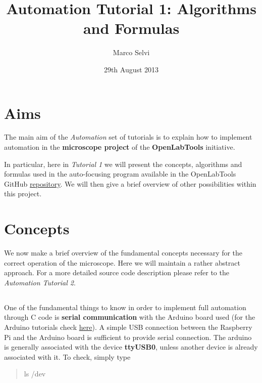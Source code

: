 \documentclass[a4paper]{article}
\begin{document}
	
	\title{Automation Tutorial 1: Algorithms and Formulas}
	\date{29th August 2013}
	\author{Marco Selvi}
	\maketitle
	
	
	\section*{Aims}
	
		The main aim of the \emph{Automation} set of tutorials is to explain how to implement automation in the \textbf{microscope project} of the \textbf{OpenLabTools} initiative.
		
		In particular, here in \emph{Tutorial 1} we will present the concepts, algorithms and formulas used in the auto-focusing program available in the OpenLabTools GitHub \href{https://github.com/OpenLabTools/Microscope}{repository}. 
		We will then give a brief overview of other possibilities within this project.
	
	
	\section*{Concepts}
	
		We now make a brief overview of the fundamental concepts necessary for the correct operation of the microscope. 
		Here we will maintain a rather abstract approach. 
		For a more detailed source code description please refer to the \emph{Automation Tutorial 2}.
	
	\subsection*{}
		
			One of the fundamental things to know in order to implement full automation through C code is \textbf{serial communication} with the Arduino board used (for the Arduino tutorials check \href{https://github.com/OpenLabTools/Microscope/tree/master/Arduino}{here}). 
			A simple USB connection between the Raspberry Pi and the Arduino board is sufficient to provide serial connection. 
			The arduino is generally associated with the device \textbf{ttyUSB0}, unless another device is already associated with it. 
			To check, simply type
		
		\begin{quote}
			ls /dev
		\end{quote}
		
\end{document}
